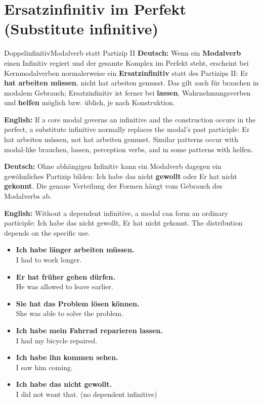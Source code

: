 \documentclass[a4paper,11pt]{article}
\newcommand{\GermanText}[1]{\textbf{Deutsch: }#1\par}
\newcommand{\EnglishText}[1]{{\small\color{SoftGray}\textbf{English: }#1\par}}
\newcommand{\ExampleItem}[2]{\item \textbf{#1}\\{\small\color{SoftGray}#2}}
\newcommand{\DEEN}[2]{\GermanText{#1}\EnglishText{#2}}
\newcommand{\Pair}[2]{\ExampleItem{#1}{#2}}
\begin{document}
\section{Ersatzinfinitiv im Perfekt \textnormal{(Substitute infinitive)}}
\begin{grammarentry}{Doppelinfinitiv}{Modalverb statt Partizip II}
\DEEN{Wenn ein \textbf{Modalverb} einen Infinitiv regiert und der gesamte Komplex im Perfekt steht, erscheint bei Kernmodalverben normalerweise ein \textbf{Ersatzinfinitiv} statt des Partizips II: \glqq Er \textbf{hat arbeiten müssen}\grqq{}, nicht \glqq hat arbeiten gemusst\grqq. Das gilt auch für brauchen in modalem Gebrauch; Ersatzinfinitiv ist ferner bei \textbf{lassen}, Wahrnehmungsverben und \textbf{helfen} möglich bzw. üblich, je nach Konstruktion.}{If a core modal governs an infinitive and the construction occurs in the perfect, a substitute infinitive normally replaces the modal's past participle: Er hat arbeiten müssen, not hat arbeiten gemusst. Similar patterns occur with modal-like brauchen, lassen, perception verbs, and in some patterns with helfen.}
\DEEN{Ohne abhängigen Infinitiv kann ein Modalverb dagegen ein gewöhnliches Partizip bilden: \glqq Ich habe das nicht \textbf{gewollt}\grqq{} oder \glqq Er hat nicht \textbf{gekonnt}\grqq. Die genaue Verteilung der Formen hängt vom Gebrauch des Modalverbs ab.}{Without a dependent infinitive, a modal can form an ordinary participle: Ich habe das nicht gewollt, Er hat nicht gekonnt. The distribution depends on the specific use.}
\end{grammarentry}
\begin{exbox}\begin{itemize}
\Pair{Ich habe länger arbeiten müssen.}{I had to work longer.}
\Pair{Er hat früher gehen dürfen.}{He was allowed to leave earlier.}
\Pair{Sie hat das Problem lösen können.}{She was able to solve the problem.}
\Pair{Ich habe mein Fahrrad reparieren lassen.}{I had my bicycle repaired.}
\Pair{Ich habe ihn kommen sehen.}{I saw him coming.}
\Pair{Ich habe das nicht gewollt.}{I did not want that. (no dependent infinitive)}
\end{itemize}\end{exbox}
\end{document}
